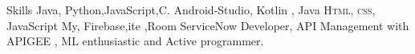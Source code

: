 
\begin{rubric}{Skills}
	Java,  Python,JavaScript,C. 
	Android-Studio, Kotlin , Java
	\textsc{Html, css}, JavaScript
\entry*[Databases]
	My, Firebase,ite ,Room 
\entry*[Misc.]
	ServiceNow Developer, API Management with APIGEE , ML enthusiastic and Active programmer.
\end{rubric}
